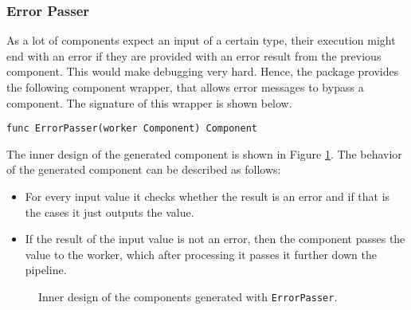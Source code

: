 \subsubsection{Error Passer}
As a lot of components expect an input of a certain type, their execution
might end with an error if they are provided with an error result from
the previous component. This would make debugging very hard. Hence, the 
package provides the following component wrapper, that allows error messages
to bypass a component. The signature of this wrapper is shown below.
\begin{lstlisting}
func ErrorPasser(worker Component) Component
\end{lstlisting}
The inner design of the generated component is shown in Figure 
\ref{fig:errPasserDiag}. The behavior of the generated component 
can be described as follows:
\begin{itemize}
	\item For every input value it checks whether the result is an error
		  and if that is the cases it just outputs the value.
	\item If the result of the input value is not an error, then the component
		  passes the value to the worker, which after processing it passes 
		  it further down the pipeline.
\end{itemize}

\begin{figure}[h]
\centering
{}
\caption[scale=1.0]{Inner design of the components generated with
  \texttt{ErrorPasser}.}
\label{fig:errPasserDiag}
\end{figure}

